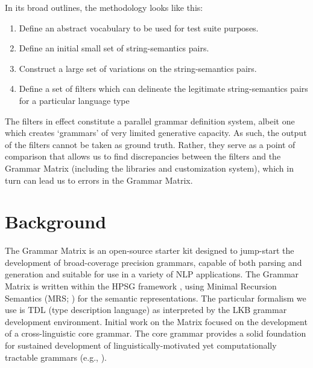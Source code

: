 \documentclass[11pt]{article}
\begin{document}
In its broad outlines, the methodology looks like this:

\begin{enumerate}
\item Define an abstract vocabulary to be used for test suite purposes.
\item Define an initial small set of string-semantics pairs.
\item Construct a large set of variations on the string-semantics pairs.
\item Define a set of filters which can delineate the legitimate string-semantics pairs for a particular language type
\end{enumerate}
%
The filters in effect constitute a parallel grammar definition
system, albeit one which creates `grammars' of very limited generative
capacity.  As such, the output of the filters cannot be taken as
ground truth.  Rather, they serve as a point of comparison that allows
us to find discrepancies between the filters and the Grammar Matrix
(including the libraries and customization system), which in turn
can lead us to errors in the Grammar Matrix.

\section{Background}
\label{GM}

The Grammar Matrix is an open-source starter kit designed to
jump-start the development of broad-coverage precision grammars,
capable of both parsing and generation and suitable for use in a
variety of NLP applications.  The Grammar Matrix is written within the
HPSG framework \cite{Pol:Sag:94}, using Minimal
Recursion Semantics (MRS; \cite{Cop:Fli:Pol:Sag:05}) for the semantic
representations. The particular formalism we use is TDL
(type description language) as interpreted by the LKB
\cite{Copestake02} grammar development environment.  Initial work on
the Matrix \cite{Ben:Fli:Oep:02,Fli:Ben:03} focused on the
development of a cross-linguistic core grammar.  The core grammar
provides a solid foundation for sustained development of
linguistically-motivated yet computationally tractable grammars (e.g.,
\cite{Hel:Hau:03,Kor:Neu:05}).  
\end{document}
